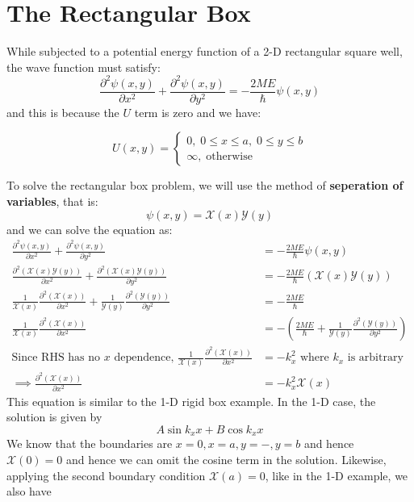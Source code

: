 \documentclass[11pt,fleqn]{book} %
\begin{document}
\section{The Rectangular Box}
While subjected to a potential energy function of a 2-D rectangular square well, the wave function must satisfy:
$$\frac{\partial^2\psi(x,y)}{\partial x^2}+\frac{\partial^2\psi(x,y)}{\partial y^2}=-\frac{2ME}{\hslash}\psi(x,y)$$
and this is because the $U$ term is zero and we have:
\begin{proposition}
    \[
    U(x,y)=\begin{cases}
        0,\;0\leq x\leq a,\;0\leq y\leq b\\
        \infty,\;\text{otherwise}
    \end{cases}
    \]
\end{proposition}
To solve the rectangular box problem, we will use the method of \textbf{seperation of variables}, that is:
$$\psi(x,y)=\mathscr{X}(x)\mathscr{Y}(y)$$
and we can solve the equation as:
\begin{align*}
    \frac{\partial^2\psi(x,y)}{\partial x^2}+\frac{\partial^2\psi(x,y)}{\partial y^2}&=-\frac{2ME}{\hslash}\psi(x,y)\\
    \frac{\partial^2\left(\mathscr{X}(x)\mathscr{Y}(y)\right)}{\partial x^2}+\frac{\partial^2\left(\mathscr{X}(x)\mathscr{Y}(y)\right)}{\partial y^2}&=-\frac{2ME}{\hslash}\left(\mathscr{X}(x)\mathscr{Y}(y)\right)\\
    \frac{1}{\mathscr{X}(x)}\frac{\partial^2\left(\mathscr{X}(x)\right)}{\partial x^2}+\frac{1}{\mathscr{Y}(y)}\frac{\partial^2\left(\mathscr{Y}(y)\right)}{\partial y^2}&=-\frac{2ME}{\hslash}\\
    \frac{1}{\mathscr{X}(x)}\frac{\partial^2\left(\mathscr{X}(x)\right)}{\partial x^2}&=-\left(\frac{2ME}{\hslash}+\frac{1}{\mathscr{Y}(y)}\frac{\partial^2\left(\mathscr{Y}(y)\right)}{\partial y^2}\right)\\
    \text{Since RHS has no $x$ dependence, }\frac{1}{\mathscr{X}(x)}\frac{\partial^2\left(\mathscr{X}(x)\right)}{\partial x^2}&=-k_x^2\text{ where $k_x$ is arbitrary}\\
    \implies\frac{\partial^2\left(\mathscr{X}(x)\right)}{\partial x^2}&=-k_x^2\mathscr{X}(x)
\end{align*}
This equation is similar to the 1-D rigid box example. In the 1-D case, the solution is given by 
$$A\sin k_xx+B\cos k_xx$$ 
We know that the boundaries are $x=0,x=a,y=-,y=b$ and hence $\mathscr{X}(0)=0$ and hence we can omit the cosine term in the solution. Likewise, applying the second boundary condition $\mathscr{X}(a)=0$, like in the 1-D example, we also have 
\end{document}
